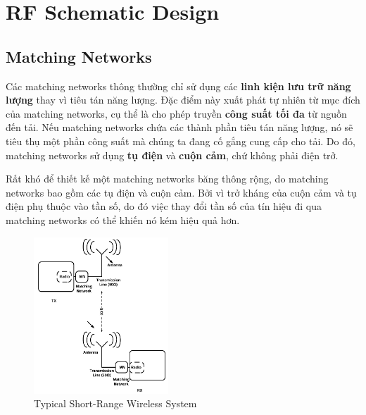 \chapter{RF Schematic Design}
    \section{Matching Networks}
        Các matching networks thông thường chỉ sử dụng các \textbf{linh kiện lưu trữ năng lượng} 
        thay vì tiêu tán năng lượng. Đặc điểm này xuất phát tự nhiên từ mục đích 
        của matching networks, cụ thể là cho phép truyền \textbf{công suất tối đa} từ nguồn đến tải. 
        Nếu matching networks chứa các thành phần tiêu tán năng lượng, nó sẽ tiêu thụ một phần công suất 
        mà chúng ta đang cố gắng cung cấp cho tải. Do đó, matching networks sử dụng \textbf{tụ điện} 
        và \textbf{cuộn cảm}, chứ không phải điện trở.\cite{allaboutcircuits_matchingNetworks}\par

        Rất khó để thiết kế một matching networks băng thông rộng, do matching networks bao gồm các tụ điện và cuộn cảm.
        Bởi vì trở kháng của cuộn cảm và tụ điện phụ thuộc vào tần số, do đó việc thay đổi tần số của tín hiệu đi qua matching networks 
        có thể khiến nó kém hiệu quả hơn.\par

        \begin{figure}[h]
            \centering
            \includegraphics[width=0.45\textwidth]{figures/wireless_system.png}
            \caption{Typical Short-Range Wireless System}
            \label{fig:wireless_system}
        \end{figure}
        \newpage

